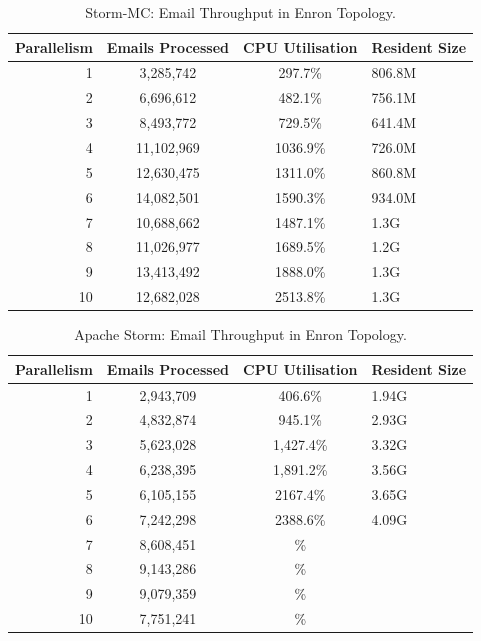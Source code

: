 \documentclass[bsc,twoside,singlespacing,normalheadings,parskip]{infthesis}\usepackage[]{graphicx}\usepackage[]{color}
\begin{document}
\begin{table}[!htb]
\begin{adjustwidth}{-0.5in}{-0.5in}
\centering
\small
\begin{tabular}{@{}rccl@{}}
    \textbf{Parallelism} & \textbf{Emails Processed} & \textbf{CPU Utilisation} & \textbf{Resident Size} \\ \toprule
    1 & {3,285,742} & {297.7\%} & {806.8M} \\
    2 & {6,696,612} & {482.1\%} & {756.1M} \\
    3 & {8,493,772} & {729.5\%} & {641.4M} \\
    4 & {11,102,969} & {1036.9\%} & {726.0M} \\
    5 & {12,630,475} & {1311.0\%} & {860.8M} \\
    6 & {14,082,501} & {1590.3\%} & {934.0M} \\
    7 & {10,688,662} & {1487.1\%} & {1.3G} \\
    8 & {11,026,977} & {1689.5\%} & {1.2G} \\
    9 & {13,413,492} & {1888.0\%} & {1.3G} \\
    10 & {12,682,028} & {2513.8\%} & {1.3G} \\
\end{tabular}
\caption{Storm-MC: Email Throughput in Enron Topology.}
\label{table:storm_mc_enron}
\end{adjustwidth}
\end{table}

\begin{table}[!htb]
\begin{adjustwidth}{-0.5in}{-0.5in}
\centering
\small
\begin{tabular}{@{}rccl@{}}
    \textbf{Parallelism} & \textbf{Emails Processed} & \textbf{CPU Utilisation} & \textbf{Resident Size} \\ \toprule
    1 & {2,943,709} & {406.6\%} & {1.94G} \\
    2 & {4,832,874} & {945.1\%} & {2.93G} \\
    3 & {5,623,028} & {1,427.4\%} & {3.32G} \\
    4 & {6,238,395} & {1,891.2\%} & {3.56G} \\
    5 & {6,105,155} & {2167.4\%} & {3.65G} \\
    6 & {7,242,298} & {2388.6\%} & {4.09G} \\
    7 & {8,608,451} & {\%} & {} \\
    8 & {9,143,286} & {\%} & {} \\
    9 & {9,079,359} & {\%} & {} \\
    10 & {7,751,241} & {\%} & {} \\
\end{tabular}
\caption{Apache Storm: Email Throughput in Enron Topology.}
\label{table:storm_enron}
\end{adjustwidth}
\end{table}
\end{document}
